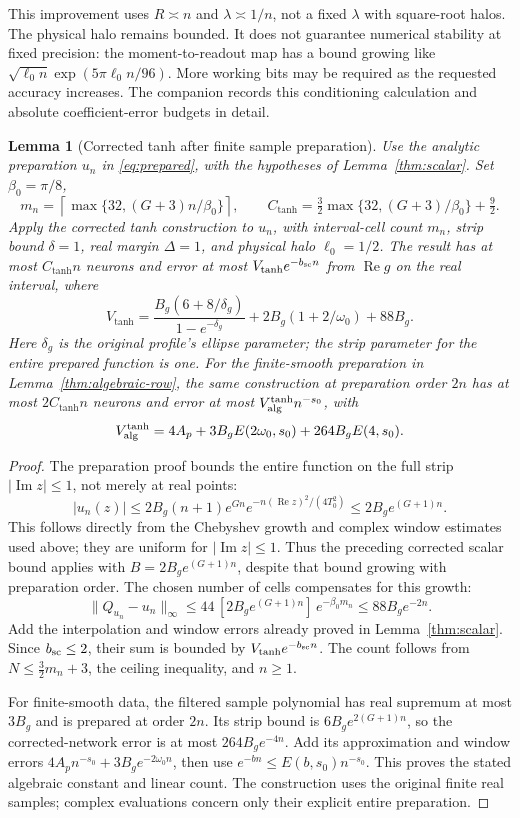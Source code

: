 \documentclass[11pt,letterpaper]{article}
\newtheorem{lemma}{Lemma}[section]
\theoremstyle{definition}
\theoremstyle{remark}
\begin{document}
This improvement uses \(R\asymp n\) and \(\lambda\asymp1/n\), not a fixed
\(\lambda\) with square-root halos. The physical halo remains bounded.
It does not guarantee numerical stability at fixed precision: the moment-to-readout
map has a bound growing like
\(\sqrt{\ell_0 n}\exp(5\pi \ell_0 n/96)\). More working bits may be required as the
requested accuracy increases. The companion
 records this conditioning calculation and absolute
coefficient-error budgets in detail.

\begin{lemma}[Corrected tanh after finite sample preparation]\label{lem:tanh-prepared}
Use the analytic preparation \(u_n\) in \eqref{eq:prepared}, with the
hypotheses of Lemma~\ref{thm:scalar}. Set \(\beta_0=\pi/8\),
\[
 m_n=\left\lceil\max\{32,(G+3)n/\beta_0\}\right\rceil,\qquad
 C_{\tanh}=\tfrac32\max\{32,(G+3)/\beta_0\}+\tfrac92.
\]
Apply the corrected tanh construction to \(u_n\), with interval-cell count
\(m_n\), strip bound \(\delta=1\), real margin \(\Delta=1\), and physical
halo \(\ell_0=1/2\). The result has at most \(C_{\tanh}n\) neurons and error
at most \(V_{\tanh}e^{-b_{\rm sc}n}\) from \(\operatorname{Re}g\) on the real interval, where
\[
 V_{\tanh}=
 \frac{B_g(6+8/\delta_g)}{1-e^{-\delta_g}}
 +2B_g(1+2/\omega_0)+88B_g.
\]
Here \(\delta_g\) is the original profile's ellipse parameter; the strip
parameter for the entire prepared function is one.
For the finite-smooth preparation in Lemma~\ref{thm:algebraic-row}, the same
construction at preparation order \(2n\) has at most \(2C_{\tanh}n\)
neurons and error at most \(V_{\rm alg}^{\tanh}n^{-s_0}\), with
\[
 V_{\rm alg}^{\tanh}=4A_p+3B_gE(2\omega_0,s_0)+264B_gE(4,s_0).
\]
\end{lemma}
\begin{proof}
The preparation proof bounds the entire function on the full strip
\(|\operatorname{Im}z|\le1\), not merely at real points:
\[
 |u_n(z)|\le2B_g(n+1)e^{Gn}
               e^{-n(\operatorname{Re}z)^2/(4T_0^2)}
 \le2B_g e^{(G+1)n}.
\]
This follows directly from the Chebyshev growth and complex window estimates
used above; they are uniform for \(|\operatorname{Im}z|\le1\).
Thus the preceding corrected scalar bound applies with
\(B=2B_g e^{(G+1)n}\), despite that bound growing with preparation order.
The chosen number of cells compensates for this growth:
\[
 \|Q_{u_n}-u_n\|_\infty
 \le44\,[2B_g e^{(G+1)n}]\,e^{-\beta_0m_n}
 \le88B_ge^{-2n}.
\]
Add the interpolation and window errors already proved in
Lemma~\ref{thm:scalar}. Since \(b_{\rm sc}\le2\), their sum is bounded
by \(V_{\tanh}e^{-b_{\rm sc}n}\).
The count follows from \(N\le\tfrac32m_n+3\), the ceiling inequality,
and \(n\ge1\).

For finite-smooth data, the filtered sample polynomial has real supremum
at most \(3B_g\) and is prepared at order \(2n\). Its strip bound is
\(6B_g e^{2(G+1)n}\), so the corrected-network error is at most
\(264B_g e^{-4n}\). Add its approximation and window errors
\(4A_pn^{-s_0}+3B_ge^{-2\omega_0n}\), then use
\(e^{-bn}\le E(b,s_0)n^{-s_0}\). This proves the stated algebraic constant
and linear count. The construction uses the original finite real samples;
complex evaluations concern only their explicit entire preparation.
\end{proof}
\end{document}

